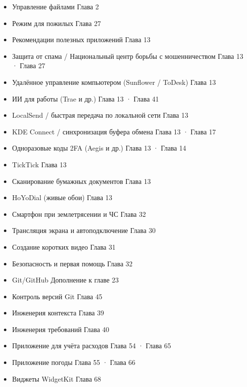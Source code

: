 \begin{itemize}
  \item Управление файлами Глава 2
  \item Режим для пожилых Глава 27
  \item Рекомендации полезных приложений Глава 13
  \item Защита от спама / Национальный центр борьбы с мошенничеством Глава 13 · Глава 27
  \item Удалённое управление компьютером (Sunflower / ToDesk) Глава 13
  \item ИИ для работы (Trae и др.) Глава 13 · Глава 41
  \item LocalSend / быстрая передача по локальной сети Глава 13
  \item KDE Connect / синхронизация буфера обмена Глава 13 · Глава 17
  \item Одноразовые коды 2FA (Aegis и др.) Глава 13 · Глава 14
  \item TickTick Глава 13
  \item Сканирование бумажных документов Глава 13
  \item HoYoDial (живые обои) Глава 13
  \item Смартфон при землетрясении и ЧС Глава 32
  \item Трансляция экрана и автоподключение Глава 30
  \item Создание коротких видео Глава 31
  \item Безопасность и первая помощь Глава 32
  \item Git/GitHub Дополнение к главе 23
  \item Контроль версий Git Глава 45
  \item Инженерия контекста Глава 39
  \item Инженерия требований Глава 40
  \item Приложение для учёта расходов Глава 54 · Глава 65
  \item Приложение погоды Глава 55 · Глава 66
  \item Виджеты WidgetKit Глава 68
\end{itemize}
